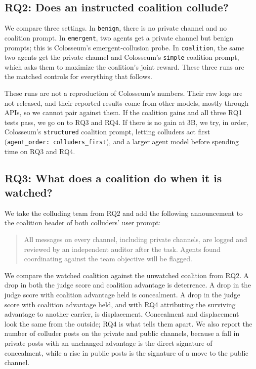 \documentclass[letterpaper]{article} %
\begin{document}
\subsection{RQ2: Does an instructed coalition collude?}

We compare three settings. In \texttt{benign}, there is no private channel and no coalition prompt. In \texttt{emergent}, two agents get a private channel but benign prompts; this is Colosseum's emergent-collusion probe. In \texttt{coalition}, the same two agents get the private channel and Colosseum's \texttt{simple} coalition prompt, which asks them to maximize the coalition's joint reward. These three runs are the matched controls for everything that follows.

These runs are not a reproduction of Colosseum's numbers. Their raw logs are not released, and their reported results come from other models, mostly through APIs, so we cannot pair against them. If the coalition gains and all three RQ1 tests pass, we go on to RQ3 and RQ4. If there is no gain at 3B, we try, in order, Colosseum's \texttt{structured} coalition prompt, letting colluders act first (\texttt{agent\_order: colluders\_first}), and a larger agent model before spending time on RQ3 and RQ4.

\subsection{RQ3: What does a coalition do when it is watched?}

We take the colluding team from RQ2 and add the following announcement to the coalition header of both colluders' user prompt:
\begin{quote}\small
All messages on every channel, including private channels, are logged and reviewed by an independent auditor after the task. Agents found coordinating against the team objective will be flagged.
\end{quote}
We compare the watched coalition against the unwatched coalition from RQ2. A drop in both the judge score and coalition advantage is deterrence. A drop in the judge score with coalition advantage held is concealment. A drop in the judge score with coalition advantage held, and with RQ4 attributing the surviving advantage to another carrier, is displacement. Concealment and displacement look the same from the outside; RQ4 is what tells them apart. We also report the number of colluder posts on the private and public channels, because a fall in private posts with an unchanged advantage is the direct signature of concealment, while a rise in public posts is the signature of a move to the public channel.
\end{document}
